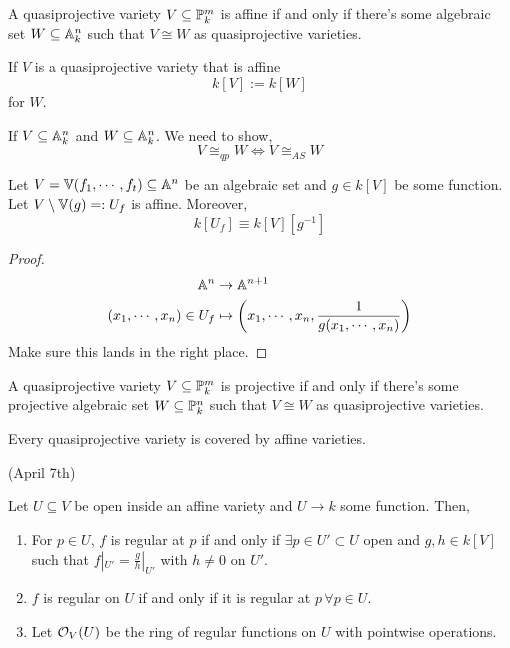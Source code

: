 \documentclass[12pt]{amsart}
\begin{document}
\begin{definition}
    A quasiprojective variety $V \subseteq \P^m_k$ is affine if and only if there's some algebraic set $W \subseteq \A^n_k$ such that $V \cong W$ as quasiprojective varieties. 
\end{definition}

If $V$ is a quasiprojective variety that is affine 
\[ k[V] := k[W]\]
for $W$. 

If $V \subseteq \A_k^n$ and $W \subseteq \A^n_k$. We need to show, 
\[ V \cong_{qp} W \iff V \cong_{AS} W \]

\begin{lemma}
    Let $V =\V(f_1, \cdots, f_t) \subseteq \A^n$ be an algebraic set and $g \in k[V]$ be some function. Let $V \setminus \V(g) =: U_f$ is affine. Moreover, 
    \[ k[U_f] \equiv k[V][g^{-1}]\]
\end{lemma}
\begin{proof}
    \begin{align*}
        \A^n &\to \A^{n+1} \\
        (x_1, \cdots, x_n) \in U_f  &\mapsto \left(x_1, \cdots, x_n, \frac{1}{g(x_1, \cdots, x_n)}\right)
    \end{align*}
    Make sure this lands in the right place. 
\end{proof}

\begin{definition}
    A quasiprojective variety $V \subseteq \P^m_k$ is projective if and only if there's some projective algebraic set $W \subseteq \P^n_k$ such that $V \cong W$ as quasiprojective varieties. 
\end{definition}


\begin{proposition}
    Every quasiprojective variety is covered by affine varieties. 
\end{proposition}

(April 7th)

\begin{definition}
    Let $U \subseteq V$ be open inside an affine variety and $U \to k$ some function. Then, 
    \begin{enumerate}
        \item For $p \in U$, $f$ is regular at $p$ if and only if $\exists p \in U' \subset U$ open and $g, h \in k[V]$ such that $f|_{U'} = \frac{g}{h}|_{U'}$ with $h \neq 0$ on $U'$.
        \item $f$ is regular on $U$ if and only if it is regular at $p \, \forall p \in U$. 
        \item Let $\OO_V(U)$ be the ring of regular functions on $U$ with pointwise operations. 
    \end{enumerate}
\end{definition}
\end{document}
